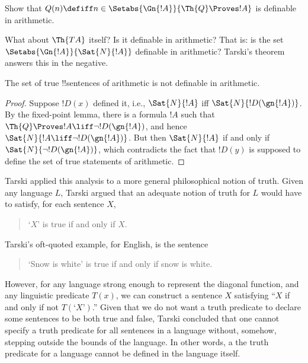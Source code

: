 \documentclass[../../../include/open-logic-section]{subfiles}
\begin{document}
\begin{prob}
Show that $Q(n) \defiff n \in \Setabs{\Gn{!A}}{\Th{Q} \Proves !A}$ is
  definable in arithmetic.
\end{prob}

What about $\Th{TA}$ itself? Is it definable in arithmetic? That
is: is the set $\Setabs{\Gn{!A}}{\Sat{N}{!A}}$ definable in
arithmetic? Tarski's theorem answers this in the negative.

\begin{thm}
The set of true !!{sentence}s of arithmetic is not definable in arithmetic.
\end{thm}

\begin{proof} 
Suppose $!D(x)$ defined it, i.e., $\Sat{N}{!A}$ iff
$\Sat{N}{!D(\gn{!A})}$. By the fixed-point lemma, there is a formula
$!A$ such that $\Th{Q} \Proves !A \liff \lnot !D(\gn{!A})$, and hence
$\Sat{N}{!A \liff \lnot !D(\gn{!A})}$. But then $\Sat{N}{!A}$ if and
only if $\Sat{N}{\lnot !D(\gn{!A})}$, which contradicts the fact that
$!D(y)$ is supposed to define the set of true statements of
arithmetic.  
\end{proof}

Tarski applied this analysis to a more general philosophical notion of
truth. Given any language $L$, Tarski argued that an adequate notion
of truth for $L$ would have to satisfy, for each sentence $X$,
\begin{quote}
`$X$' is true if and only if $X$.
\end{quote}
Tarski's oft-quoted example, for English, is the sentence
\begin{quote}
`Snow is white' is true if and only if snow is white.
\end{quote}
However, for any language strong enough to represent the diagonal
function, and any linguistic predicate $T(x)$, we can construct a
sentence $X$ satisfying ``$X$ if and only if not $T(\text{`$X$'})$.''
Given that we do not want a truth predicate to declare some sentences
to be both true and false, Tarski concluded that one cannot specify a
truth predicate for all sentences in a language without, somehow,
stepping outside the bounds of the language. In other words, a the
truth predicate for a language cannot be defined in the language
itself.
\end{document}
